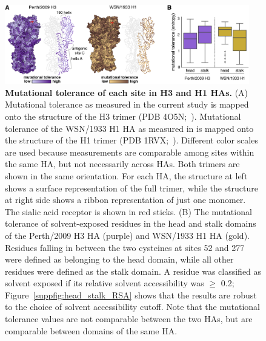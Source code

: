 \documentclass[9pt,twocolumn,twoside]{pnas-new}
\begin{document}
\begin{figure}[ht]
\centering
\includegraphics[width=0.95\textwidth]{figs/mut_tolerance/mut_tolerance_new.pdf}
\caption{\label{fig:mut_tolerance}
{\bf Mutational tolerance of each site in H3 and H1 HAs.}
(A) Mutational tolerance as measured in the current study is mapped onto the structure of the H3 trimer (PDB 4O5N;~\cite{lee2014receptor}).
Mutational tolerance of the WSN/1933 H1 HA as measured in \cite{doud2016accurate} is mapped onto the structure of the H1 trimer (PDB 1RVX;~\cite{gamblin2004structure}).
Different color scales are used because measurements are comparable among sites within the same HA, but not necessarily across HAs.
Both trimers are shown in the same orientation.
For each HA, the structure at left shows a surface representation of the full trimer, while the structure at right side shows a ribbon representation of just one monomer.
The sialic acid receptor is shown in red sticks.
(B) The mutational tolerance of solvent-exposed residues in the head and stalk domains of the Perth/2009 H3 HA (purple) and WSN/1933 H1 HA (gold).
Residues falling in between the two cysteines at sites 52 and 277 were defined as belonging to the head domain, while all other residues were defined as the stalk domain.
A residue was classified as solvent exposed if its relative solvent accessibility was $\geq$ 0.2; Figure~\ref{suppfig:head_stalk_RSA} shows that the results are robust to the choice of solvent accessibility cutoff.
Note that the mutational tolerance values are not comparable between the two HAs, but are comparable between domains of the same HA.
}
\end{figure}
\end{document}
